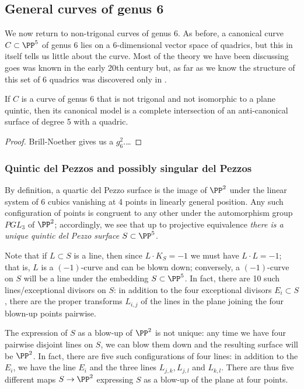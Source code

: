\subsection{General curves of genus 6} 

We now return to non-trigonal curves of genus 6. As before, a canonical curve $C \subset \PP^5$ of genus 6 lies on a 6-dimensional vector space of quadrics, but this in itself tells us little about the curve. Most of the theory we have been discussing goes was known in the early 20th century but, as far as we know the structure of this set of
6 quadrics was discovered only in \cite{MR744297}.

\begin{theorem}\label{general genus 6}
If $C$ is a curve of genus 6 that is not trigonal and not isomorphic to a plane quintic, then its canonical model is a complete intersection of an anti-canonical surface of degree 5 with a quadric.
\end{theorem}

\begin{proof}
 Brill-Noether gives us a $g^2_6$.\dots
\end{proof}

\subsubsection{Quintic del Pezzos and possibly singular del Pezzos}

By definition, a quartic del Pezzo surface is the image of $\PP^2$ under the linear system of 6
cubics vanishing at 4 points in linearly general position. Any such configuration of points is congruent to any other under the automorphism group $PGL_3$ of $\PP^2$; accordingly, we see that up to projective equivalence \emph{there is a unique quintic del Pezzo surface $S \subset \PP^5$}.

Note that if $L \subset S$ is a line, then since $L \cdot K_S = -1$ we must have $L\cdot L = -1$; that is, $L$ is a $(-1)$-curve and can be blown down; conversely, a $(-1)$-curve on $S$ will be a line under the embedding $S \subset \PP^5$. In fact, there are 10 such lines/exceptional divisors on $S$: in addition to the four exceptional divisors $E_i \subset S$, there are the proper transforms $L_{i,j}$ of the lines in the plane joining the four blown-up points pairwise.

The expression of $S$ as a blow-up of $\PP^2$ is not unique: any time we have four pairwise disjoint lines on $S$, we can blow them down and the resulting surface will be $\PP^2$.  In fact, there are five such configurations of four lines: in addition to the $E_i$, we have the line $E_i$ and the three lines $L_{j,k}, L_{j,l}$ and $L_{k,l}$. There are thus five different maps $S \to \PP^2$ expressing $S$ as a blow-up of the plane at four points.

